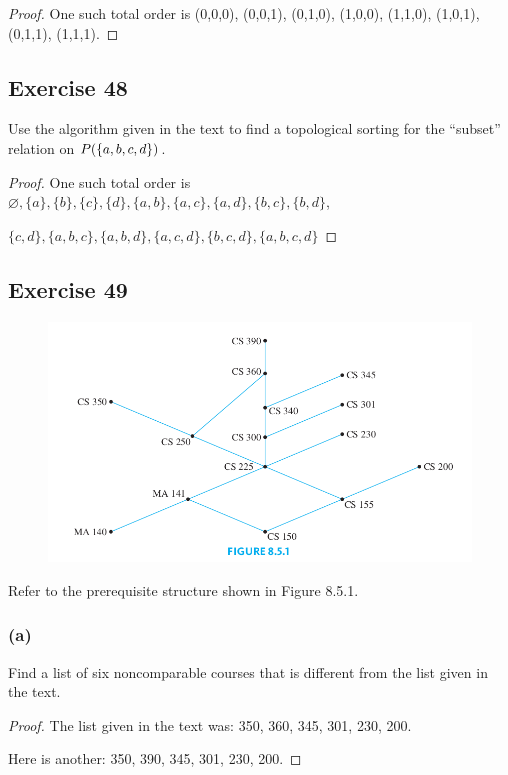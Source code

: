 \documentclass[14pt]{extarticle}
\let\mathscr\relax
\newcommand{\ps}{\mathscr{P}} %
\newcommand{\es}{\varnothing}
\begin{document}
\begin{proof}
One such total order is (0,0,0), (0,0,1), (0,1,0), (1,0,0), (1,1,0), (1,0,1), (0,1,1), (1,1,1).
\end{proof}

\subsection{Exercise 48}
Use the algorithm given in the text to find a topological sorting for the “subset” relation on \(\ps(\{a, b, c, d\})\).

\begin{proof}
One such total order is \(\es, \{a\}, \{b\}, \{c\}, \{d\}, \{a,b\}, \{a,c\}, \{a,d\}, \{b,c\}, \{b,d\}\),

\(\{c,d\}, \{a,b,c\}, \{a,b,d\}, \{a,c,d\}, \{b,c,d\}, \{a,b,c,d\}\)
\end{proof}

\subsection{Exercise 49}
\begin{figure}[ht!]
\centering
\includegraphics[scale=0.5]{../images/8.5.1.png}
\end{figure}

Refer to the prerequisite structure shown in Figure 8.5.1.

\subsubsection{(a)}
Find a list of six noncomparable courses that is different from the list given in the text.

\begin{proof}
The list given in the text was: 350, 360, 345, 301, 230, 200.

Here is another: 350, 390, 345, 301, 230, 200.
\end{proof}
\end{document}
